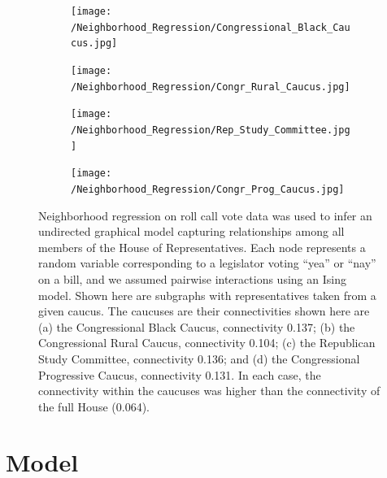 \documentclass{article}
\begin{document}
\begin{figure}[h]
  \centering
    \begin{subfigure}[b]{0.49\textwidth}
        \texttt{[image: /Neighborhood\_Regression/Congressional\_Black\_Caucus.jpg]}
        \caption{}
    \end{subfigure}
          \begin{subfigure}[b]{0.49\textwidth}
        \texttt{[image: /Neighborhood\_Regression/Congr\_Rural\_Caucus.jpg]}
        \caption{}
    \end{subfigure}
        \begin{subfigure}[b]{0.49\textwidth}
        \texttt{[image: /Neighborhood\_Regression/Rep\_Study\_Committee.jpg]}
        \caption{}
    \end{subfigure}
          \begin{subfigure}[b]{0.49\textwidth}
        \texttt{[image: /Neighborhood\_Regression/Congr\_Prog\_Caucus.jpg]}
        \caption{}
    \end{subfigure}
  \caption{Neighborhood regression on roll call vote data was used to infer an undirected graphical model capturing relationships among all members of the House of Representatives. Each node represents a random variable corresponding to a legislator voting ``yea'' or ``nay'' on a bill, and we assumed pairwise interactions using an Ising model. Shown here are subgraphs with representatives taken from a given caucus. The caucuses are their connectivities shown here are (a) the Congressional Black Caucus, connectivity 0.137; (b) the Congressional Rural Caucus, connectivity 0.104; (c) the Republican Study Committee, connectivity 0.136; and (d) the Congressional Progressive Caucus, connectivity 0.131. In each case, the connectivity within the caucuses was higher than the connectivity of the full House (0.064).}
      \label{fig:Nhood_Caucus}
\end{figure}



\newpage


\section{Model}
\label{model}
\end{document}
